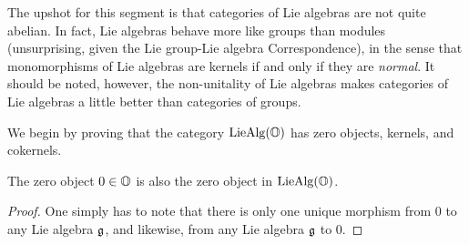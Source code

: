                     The upshot for this segment is that categories of Lie algebras are not quite abelian. In fact, Lie algebras behave more like groups than modules (unsurprising, given the Lie group-Lie algebra Correspondence), in the sense that monomorphisms of Lie algebras are kernels if and only if they are \textit{normal}. It should be noted, however, the non-unitality of Lie algebras makes categories of Lie algebras a little better than categories of groups. 
                    
                    We begin by proving that the category $\mathrm{Lie}\mathrm{Alg}(\mathbb{O})$ has zero objects, kernels, and cokernels.
                    \begin{proposition} \label{prop: zero_lie_algebra}
                        The zero object $0 \in \mathbb{O}$ is also the zero object in $\mathrm{Lie}\mathrm{Alg}(\mathbb{O})$.
                    \end{proposition}
                        \begin{proof}
                            One simply has to note that there is only one unique morphism from $0$ to any Lie algebra $\mathfrak{g}$, and likewise, from any Lie algebra $\mathfrak{g}$ to $0$. 
                        \end{proof}
                        
